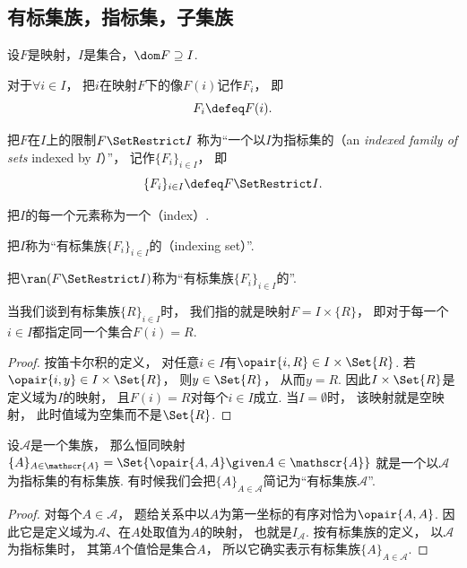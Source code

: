 \subsection{有标集族，指标集，子集族}\label{section:集合论.指标集}
\begin{definition}
设\(F\)是映射，\(I\)是集合，\(\dom F \supseteq I\).

对于\(\forall i \in I\)，
把\(i\)在映射\(F\)下的像\(F(i)\)记作\(F_i\)，
即\begin{equation*}
	F_i \defeq F(i).
\end{equation*}

把\(F\)在\(I\)上的限制\(F \SetRestrict I\)
称为“一个以\(I\)为指标集的（an \emph{indexed family of sets} indexed by \(I\)）”，
记作\(\{F_i\}_{i \in I}\)，
即\begin{equation*}
	\{F_i\}_{i\in I}
	\defeq
	F \SetRestrict I.
\end{equation*}

把\(I\)的每一个元素称为一个（index）.

把\(I\)称为“有标集族\(\{F_i\}_{i \in I}\)的（indexing set）”.

把\(\ran(F \SetRestrict I)\)称为“有标集族\(\{F_i\}_{i \in I}\)的”.
\end{definition}

\begin{example}
    当我们谈到有标集族\(\{R\}_{i \in I}\)时，
    我们指的就是映射\(F = I \times \{R\}\)，
    即对于每一个\(i \in I\)都指定同一个集合\(F(i) = R\).
    \begin{proof}
        按笛卡尔积的定义，
        对任意\(i\in I\)有\(\opair{i,R}\in I\times\Set{R}\).
        若\(\opair{i,y}\in I\times\Set{R}\)，
        则\(y\in\Set{R}\)，
        从而\(y=R\).
        因此\(I\times\Set{R}\)是定义域为\(I\)的映射，
        且\(F(i)=R\)对每个\(i\in I\)成立.
        当\(I=\emptyset\)时，
        该映射就是空映射，
        此时值域为空集而不是\(\Set{R}\).
    \end{proof}
\end{example}

\begin{example}
    设\(\mathscr{A}\)是一个集族，
    那么恒同映射\(\{A\}_{A \in \mathscr{A}} = \Set{ \opair{A,A} \given A \in \mathscr{A} }\)
    就是一个以\(\mathscr{A}\)为指标集的有标集族.
    有时候我们会把\(\{A\}_{A \in \mathscr{A}}\)简记为“有标集族\(\mathscr{A}\)”.
    \begin{proof}
        对每个\(A\in\mathscr{A}\)，
        题给关系中以\(A\)为第一坐标的有序对恰为\(\opair{A,A}\).
        因此它是定义域为\(\mathscr{A}\)、在\(A\)处取值为\(A\)的映射，
        也就是\(I_{\mathscr{A}}\).
        按有标集族的定义，
        以\(\mathscr{A}\)为指标集时，
        其第\(A\)个值恰是集合\(A\)，
        所以它确实表示有标集族\(\{A\}_{A\in\mathscr{A}}\).
    \end{proof}
\end{example}

